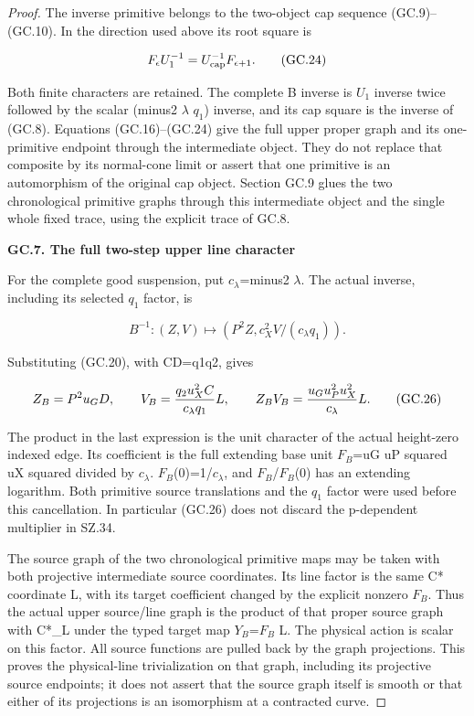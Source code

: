 \begin{proof}
The inverse primitive belongs to the two-object cap sequence
(GC.9)--(GC.10). In the direction used above its root square is

\[
                    F_\epsilon U_1^{-1}
                         =U_{\rm cap}^{-1}F_{\epsilon+1}.
 \tag{GC.24}
\]

Both finite characters are retained. The complete B inverse is
\(U_1\) inverse twice followed by the scalar (minus2 \(\lambda\) \(q_1\))
inverse, and its cap square is the inverse of (GC.8).
Equations (GC.16)--(GC.24) give the full upper proper graph and
its one-primitive endpoint through the intermediate object.
They do not replace that composite by its normal-cone limit or
assert that one primitive is an automorphism of the original
cap object. Section GC.9 glues the two chronological primitive
graphs through this intermediate object and the single whole
fixed trace, using the explicit trace of GC.8.

\par

\medskip\noindent\textbf{GC.7. The full two-step upper line character}

\par\nobreak

For the complete good suspension, put \(c_{\lambda}\)=minus2 \(\lambda\).
The actual inverse, including its selected \(q_1\) factor, is

\[
 B^{-1}:(Z,V)\longmapsto
       (P^2Z,c_X^2V/(c_\lambda q_1)).
 \tag{GC.25}
\]

Substituting (GC.20), with CD=q1q2, gives

\[
 Z_B=P^2u_GD,\qquad
 V_B={q_2u_X^2C\over c_\lambda q_1}L,\qquad
 Z_BV_B={u_Gu_P^2u_X^2\over c_\lambda}L.
 \tag{GC.26}
\]

The product in the last expression is the unit character of
the actual height-zero indexed edge. Its coefficient is the
full extending base unit \(F_{B}\)=uG uP squared uX squared divided
by \(c_{\lambda}\). \(F_{B}\)(0)=1/\(c_{\lambda}\), and \(F_{B}\)/\(F_{B}\)(0) has an
extending logarithm. Both primitive source translations and
the \(q_1\) factor were used before this cancellation. In particular
(GC.26) does not discard the p-dependent multiplier in SZ.34.

The source graph of the two chronological primitive maps may
be taken with both projective intermediate source coordinates.
Its line factor is the same C* coordinate L, with its target
coefficient changed by the explicit nonzero \(F_{B}\). Thus the
actual upper source/line graph is the product of that proper
source graph with C*\_L under the typed target map
\(Y_{B}\)=\(F_{B}\) L. The physical action is scalar on this factor.
All source functions are pulled back by the graph projections.
This proves the physical-line trivialization on that graph,
including its projective source endpoints; it does not assert
that the source graph itself is smooth or that either of its
projections is an isomorphism at a contracted curve.


\end{proof}
